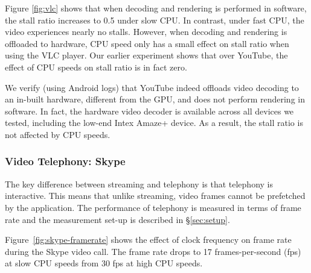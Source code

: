 Figure \ref{fig:vlc} shows that when decoding and rendering is performed in software, the stall ratio increases to 0.5 under slow CPU. In contrast, under fast CPU, the video experiences nearly no stalls. However, when decoding and rendering is offloaded to hardware, CPU speed only has a small effect on stall ratio when using the VLC player. Our earlier experiment shows that over YouTube, the effect of CPU speeds on stall ratio is in fact zero. 

We verify (using Android logs)  that YouTube indeed offloads video decoding to an in-built hardware, different from the GPU, and does not perform rendering in software. %
 In fact, the hardware video decoder is available across all devices we tested, including the low-end Intex Amaze+ device. As a result, the stall ratio is not affected by CPU speeds.




\subsubsection{Video Telephony: Skype}

The key difference between streaming and telephony is that telephony is interactive. This means that unlike streaming,  video frames cannot be prefetched by the application. The performance of telephony is measured in terms of frame rate %
and the measurement set-up is described in \S\ref{sec:setup}.

Figure~\ref{fig:skype-framerate} shows the effect of clock frequency on frame rate during the Skype video call. 
The frame rate drops to 17 frames-per-second (fps) at slow CPU speeds from 30 fps at high CPU speeds. 

